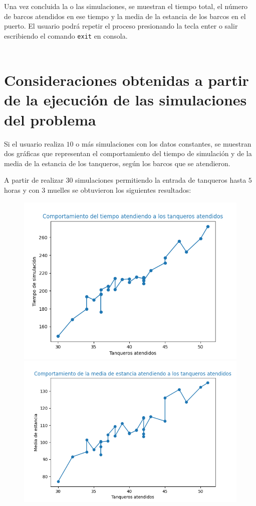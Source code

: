 \documentclass[twoside]{article}
\begin{document}
Una vez concluida la o las simulaciones, se muestran el tiempo total, el n\'umero de barcos atendidos en ese tiempo y la media de  la estancia de los barcos en el puerto. El usuario podr\'a repetir el proceso presionando la tecla enter o salir escribiendo el comando \texttt{exit} en consola.\\\\

\section{Consideraciones obtenidas a partir de la ejecuci\'on de las simulaciones del problema}
Si el usuario realiza $10$ o m\'as simulaciones con los datos constantes, se muestran dos gr\'aficas que representan el comportamiento del tiempo de simulaci\'on y de la media de la estancia de los tanqueros, seg\'un los barcos que se atendieron.

A partir de realizar 30 simulaciones permitiendo la entrada de tanqueros hasta $5$ horas y con 3 muelles se obtuvieron los siguientes resultados:\\

\begin{figure}[h]

\includegraphics[scale = 0.39]{img/Figure_1.png}
\includegraphics[scale=0.39]{img/Figure_2.png}
\caption{}

\end{figure}
\end{document}
